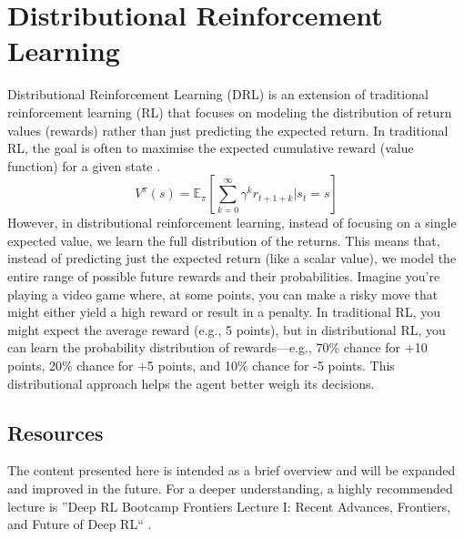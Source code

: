 \section{Distributional Reinforcement Learning}
Distributional Reinforcement Learning (DRL) is an extension of traditional reinforcement 
learning (RL) that focuses on modeling the distribution of return values (rewards) rather 
than just predicting the expected return.\newline
In traditional RL, the goal is often to maximise the expected cumulative reward (value function) for a given state . $$V ^\pi(s) = \mathbb{E}_\pi\left[\sum_{k=0}^\infty\gamma^k r_{t+1+k}|s_t=s\right]$$
However, in distributional reinforcement learning, instead of focusing on a single expected 
value, we learn the full distribution of the returns. This means that, instead of predicting 
just the expected return (like a scalar value), we model the entire range of possible future 
rewards and their probabilities. \newline
Imagine you're playing a video game where, at some points, you can make a risky move that 
might either yield a high reward or result in a penalty. In traditional RL, you might expect 
the average reward (e.g., 5 points), but in distributional RL, you can learn the probability 
distribution of rewards—e.g., 70\% chance for +10 points, 20\% chance for +5 points, and 
10\% chance for -5 points. This distributional approach helps the agent better weigh its 
decisions.

\subsection{Resources}
The content presented here is intended as a brief overview and will be expanded and improved in the future. For a deeper 
understanding, a highly recommended lecture is ''Deep RL Bootcamp Frontiers Lecture I: Recent Advances, Frontiers, and 
Future of Deep RL`` \cite{DeepRlBootcamp}.




